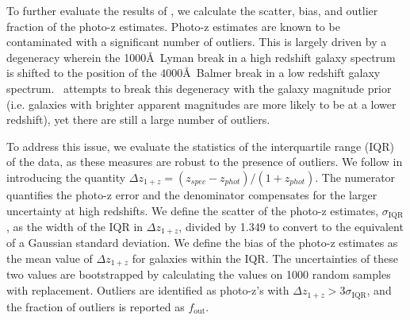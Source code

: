 To further evaluate the results of \bpz, we calculate the scatter, bias, and outlier fraction of the photo-z estimates. 
Photo-z estimates are known to be contaminated with a significant number of outliers.
This is largely driven by a degeneracy wherein the 1000\AA\ Lyman break in a high redshift galaxy spectrum is shifted to the position of the 4000\AA\ Balmer break in a low redshift galaxy spectrum. 
\bpz\ attempts to break this degeneracy with the galaxy magnitude prior (i.e. galaxies with brighter apparent magnitudes are more likely to be at a lower redshift), yet there are still a large number of outliers.

To address this issue, we evaluate the statistics of the interquartile range (IQR) of the data, as these measures are robust to the presence of outliers.
We follow \citet{Graham2018a} in introducing the quantity $\Delta z_{1+z} = (z_{spec} - z_{phot})/(1 + z_{phot})$.
The numerator quantifies the photo-z error and the denominator compensates for the larger uncertainty at high redshifts. 
We define the scatter of the photo-z estimates, $\sigma_\text{IQR}$,  as the width of the IQR in $\Delta z_{1+z}$, divided by 1.349 to convert to the equivalent of a Gaussian standard deviation. 
We define the bias of the photo-z estimates as the mean value of $\Delta z_{1+z}$ for galaxies within the IQR.
The uncertainties of these two values are bootstrapped by calculating the values on 1000 random samples with replacement. 
Outliers are identified as photo-z's with $\Delta z_{1+z} > 3 \sigma_{\text{IQR}}$, and the fraction of outliers is reported as $f_\text{out}$.

